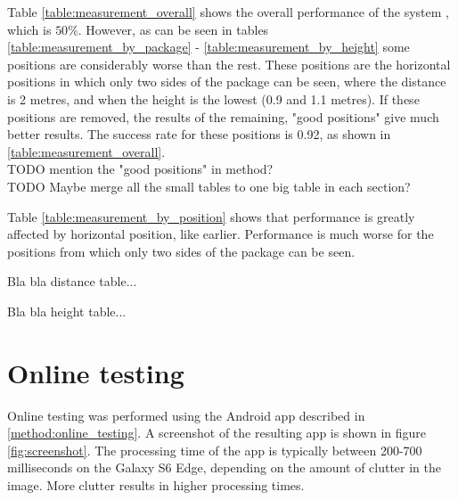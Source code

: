 Table \ref{table:measurement_overall} shows the overall performance of the system , which is $50\%$. However, as can be seen in tables \ref{table:measurement_by_package} - \ref{table:measurement_by_height} some positions are considerably worse than the rest.
These positions are the horizontal positions in which only two sides of the package can be seen, where the distance is 2 metres, and when the height is the lowest (0.9 and 1.1 metres).
If these positions are removed, the results of the remaining, "good positions" give much better results. The success rate for these positions is 0.92, as shown in \ref{table:measurement_overall}.
\\TODO mention the "good positions" in method? %
\\TODO Maybe merge all the small tables to one big table in each section? %





Table \ref{table:measurement_by_position} shows that performance is greatly affected by horizontal position, like earlier. Performance is much worse for the positions from which only two sides of the package can be seen. 



Bla bla distance table... %



Bla bla height table... %



\section{Online testing}

Online testing was performed using the Android app described in \ref{method:online_testing}.
A screenshot of the resulting app is shown in figure \ref{fig:screenshot}.
The processing time of the app is typically between 200-700 milliseconds on the Galaxy S6 Edge, depending on the amount of clutter in the image. %
More clutter results in higher processing times.

